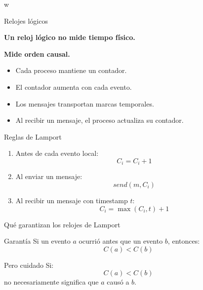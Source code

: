 w\documentclass[aspectratio=169]{beamer}
\begin{document}
\begin{frame}{Relojes lógicos}

\Large

\begin{center}
\textbf{Un reloj lógico no mide tiempo físico.}
\end{center}

\vspace{0.6cm}

\begin{center}
\textbf{Mide orden causal.}
\end{center}

\vspace{0.8cm}

\normalsize

\begin{itemize}
    \item Cada proceso mantiene un contador.
    \item El contador aumenta con cada evento.
    \item Los mensajes transportan marcas temporales.
    \item Al recibir un mensaje, el proceso actualiza su contador.
\end{itemize}

\end{frame}

\begin{frame}{Reglas de Lamport}

\Large

\begin{enumerate}
    \item Antes de cada evento local:
    \[
    C_i = C_i + 1
    \]
    
    \item Al enviar un mensaje:
    \[
    send(m, C_i)
    \]
    
    \item Al recibir un mensaje con timestamp $t$:
    \[
    C_i = \max(C_i, t) + 1
    \]
\end{enumerate}

\end{frame}

\begin{frame}{Qué garantizan los relojes de Lamport}

\Large

\begin{block}{Garantía}
Si un evento $a$ ocurrió antes que un evento $b$, entonces:
\[
C(a) < C(b)
\]
\end{block}

\vspace{0.7cm}

\begin{alertblock}{Pero cuidado}
Si:
\[
C(a) < C(b)
\]
no necesariamente significa que $a$ causó a $b$.
\end{alertblock}

\end{frame}
\end{document}
